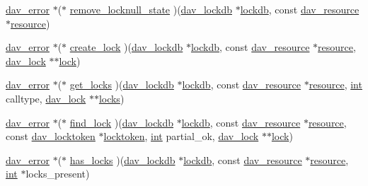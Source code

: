 \begin{DoxyCompactItemize}
\item 
\hyperlink{structdav__error}{dav\+\_\+error} $\ast$($\ast$ \hyperlink{structdav__hooks__locks_a222905b4adb2d8fe92cbfaa62c31900b}{remove\+\_\+locknull\+\_\+state} )(\hyperlink{structdav__lockdb}{dav\+\_\+lockdb} $\ast$\hyperlink{group__MOD__DAV_ga4d2e2ae951dbf7731ef129422cb95674}{lockdb}, const \hyperlink{structdav__resource}{dav\+\_\+resource} $\ast$\hyperlink{group__APR__Util__RL_gaa6244aacafcc4ec1d0727bdb32614b11}{resource})
\item 
\hyperlink{structdav__error}{dav\+\_\+error} $\ast$($\ast$ \hyperlink{structdav__hooks__locks_a82e887ab1f259130daf9ebe87347f47c}{create\+\_\+lock} )(\hyperlink{structdav__lockdb}{dav\+\_\+lockdb} $\ast$\hyperlink{group__MOD__DAV_ga4d2e2ae951dbf7731ef129422cb95674}{lockdb}, const \hyperlink{structdav__resource}{dav\+\_\+resource} $\ast$\hyperlink{group__APR__Util__RL_gaa6244aacafcc4ec1d0727bdb32614b11}{resource}, \hyperlink{structdav__lock}{dav\+\_\+lock} $\ast$$\ast$\hyperlink{group__APR__Util__RMM_ga0353fe7d0bd33c38d9a7a57a73b6407e}{lock})
\item 
\hyperlink{structdav__error}{dav\+\_\+error} $\ast$($\ast$ \hyperlink{structdav__hooks__locks_a46239c6e669cd43025d41afd3d7f89b1}{get\+\_\+locks} )(\hyperlink{structdav__lockdb}{dav\+\_\+lockdb} $\ast$\hyperlink{group__MOD__DAV_ga4d2e2ae951dbf7731ef129422cb95674}{lockdb}, const \hyperlink{structdav__resource}{dav\+\_\+resource} $\ast$\hyperlink{group__APR__Util__RL_gaa6244aacafcc4ec1d0727bdb32614b11}{resource}, \hyperlink{pcre_8txt_a42dfa4ff673c82d8efe7144098fbc198}{int} calltype, \hyperlink{structdav__lock}{dav\+\_\+lock} $\ast$$\ast$\hyperlink{group__MOD__DAV_ga3d3cc325e4516ee89b4f0890dba7514e}{locks})
\item 
\hyperlink{structdav__error}{dav\+\_\+error} $\ast$($\ast$ \hyperlink{structdav__hooks__locks_a5941264a3e041a9798f8cf538bb2f4dd}{find\+\_\+lock} )(\hyperlink{structdav__lockdb}{dav\+\_\+lockdb} $\ast$\hyperlink{group__MOD__DAV_ga4d2e2ae951dbf7731ef129422cb95674}{lockdb}, const \hyperlink{structdav__resource}{dav\+\_\+resource} $\ast$\hyperlink{group__APR__Util__RL_gaa6244aacafcc4ec1d0727bdb32614b11}{resource}, const \hyperlink{structdav__locktoken}{dav\+\_\+locktoken} $\ast$\hyperlink{group__MOD__DAV_gaa2478c643fbd5d72dc6c31696dfc6a03}{locktoken}, \hyperlink{pcre_8txt_a42dfa4ff673c82d8efe7144098fbc198}{int} partial\+\_\+ok, \hyperlink{structdav__lock}{dav\+\_\+lock} $\ast$$\ast$\hyperlink{group__APR__Util__RMM_ga0353fe7d0bd33c38d9a7a57a73b6407e}{lock})
\item 
\hyperlink{structdav__error}{dav\+\_\+error} $\ast$($\ast$ \hyperlink{structdav__hooks__locks_aff34306a6307f46c0394ea65170acd1b}{has\+\_\+locks} )(\hyperlink{structdav__lockdb}{dav\+\_\+lockdb} $\ast$\hyperlink{group__MOD__DAV_ga4d2e2ae951dbf7731ef129422cb95674}{lockdb}, const \hyperlink{structdav__resource}{dav\+\_\+resource} $\ast$\hyperlink{group__APR__Util__RL_gaa6244aacafcc4ec1d0727bdb32614b11}{resource}, \hyperlink{pcre_8txt_a42dfa4ff673c82d8efe7144098fbc198}{int} $\ast$locks\+\_\+present)
$$
\end{DoxyCompactItemize}
